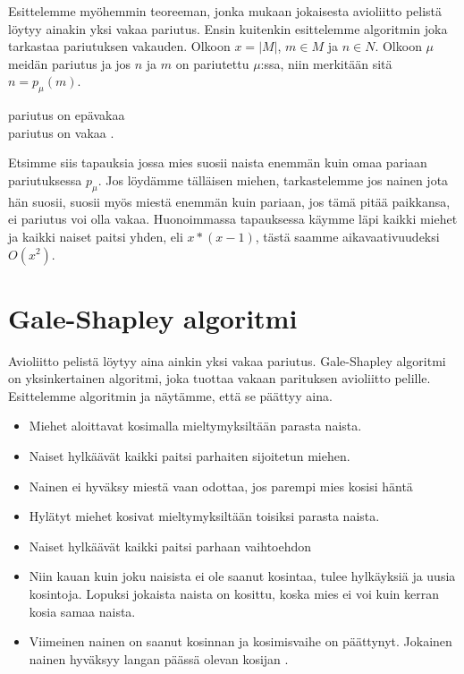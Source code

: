 \documentclass[finnish]{tktltiki2}
\theoremstyle{definition}
\theoremstyle{remark}
\begin{document}
Esittelemme myöhemmin teoreeman, jonka mukaan jokaisesta avioliitto pelistä löytyy ainakin yksi vakaa pariutus. Ensin kuitenkin esittelemme algoritmin joka tarkastaa pariutuksen vakauden.
Olkoon $x = |M|$, $m \in M$ ja $n \in N$. Olkoon $\mu$ meidän pariutus ja jos $n$ ja $m$ on pariutettu $\mu$:ssa, niin merkitään sitä $n = p_\mu(m)$.
\begin{algorithmic}
				\State \Return pariutus on epävakaa
			\EndIf
		\EndFor
	\EndFor\\
	\Return pariutus on vakaa
	\cite[p. 8]{gusfield1989stable}.
\end{algorithmic}

Etsimme siis tapauksia jossa mies suosii naista enemmän kuin omaa pariaan pariutuksessa $p_\mu$.
Jos löydämme tälläisen miehen, tarkastelemme jos nainen jota hän suosii, suosii myös miestä enemmän kuin pariaan, jos tämä pitää paikkansa, ei pariutus voi olla vakaa.
Huonoimmassa tapauksessa käymme läpi kaikki miehet ja kaikki naiset paitsi yhden, eli $x*(x-1)$, tästä saamme aikavaativuudeksi $O(x^2)$.

\section{Gale-Shapley algoritmi}
Avioliitto pelistä löytyy aina ainkin yksi vakaa pariutus. Gale-Shapley algoritmi on yksinkertainen algoritmi, joka tuottaa vakaan parituksen avioliitto pelille. Esittelemme algoritmin ja näytämme, että se päättyy aina.
\begin{itemize}
	\item Miehet aloittavat kosimalla mieltymyksiltään parasta naista.
	\item Naiset hylkäävät kaikki paitsi parhaiten sijoitetun miehen.
	\item Nainen ei hyväksy miestä vaan odottaa, jos parempi mies kosisi häntä
	\item Hylätyt miehet kosivat mieltymyksiltään toisiksi parasta naista.
	\item Naiset hylkäävät kaikki paitsi parhaan vaihtoehdon
	\item Niin kauan kuin joku naisista ei ole saanut kosintaa, tulee hylkäyksiä ja uusia kosintoja. Lopuksi jokaista naista on kosittu, koska mies ei voi kuin kerran kosia samaa naista.
	\item Viimeinen nainen on saanut kosinnan ja kosimisvaihe on päättynyt. Jokainen nainen hyväksyy langan päässä olevan kosijan \cite[p. 13]{gale62a}.
\end{itemize}
\end{document}
